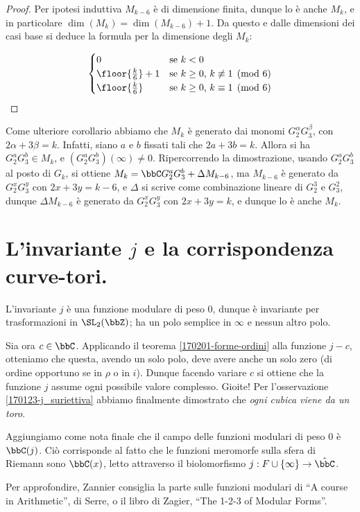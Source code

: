\begin{proof}
	Per ipotesi induttiva $M_{k-6}$ è di dimensione finita, dunque lo è anche $M_k$, e in particolare $\dim(M_k)=\dim(M_{k-6})+1$.
	Da questo e dalle dimensioni dei casi base si deduce la formula per la dimensione degli $M_k$:
	
	\begin{equation*}
		\begin{cases}
			0 						&	\text{se $k<0$}\\
			\floor{\frac{k}{6}} +1	&	\text{se $k\geq0$, $k\not\equiv1\pmod{6}$}\\
			\floor{\frac{k}{6}}		&	\text{se $k\geq0$, $k\equiv1\pmod{6}$}
		\end{cases}
	\end{equation*}

\end{proof}

Come ulteriore corollario abbiamo che $M_k$ è generato dai monomi $G_2^\alpha G_3^\beta$, con $2\alpha+3\beta=k$.
Infatti, siano $a$ e $b$ fissati tali che $2a+3b=k$.
Allora si ha $G_2^a G_3^b\in M_k$, e $(G_2^a G_3^b)(\infty)\neq0$.
Ripercorrendo la dimostrazione, usando $G_2^a G_3^b$ al posto di $G_k$, si ottiene $M_k=\bbC G_2^a G_3^b + \Delta M_{k-6}$, ma $M_{k-6}$ è generato da $G_2^x G_3^y$ con $2x+3y=k-6$, e $\Delta$ si scrive come combinazione lineare di $G_2^3$ e $G_3^2$, dunque $\Delta M_{k-6}$ è generato da $G_2^x G_3^y$ con $2x+3y=k$, e dunque lo è anche $M_k$.


\section{L'invariante $j$ e la corrispondenza curve-tori.}

L'invariante $j$ è una funzione modulare di peso $0$, dunque è invariante per trasformazioni in $\SL_2(\bbZ)$; ha un polo semplice in $\infty$ e nessun altro polo.

Sia ora $c \in \bbC$. Applicando il teorema \ref{170201-forme-ordini} alla funzione $j-c$, otteniamo che questa, avendo un solo polo, deve avere anche un solo zero (di ordine opportuno se in $\rho$ o in $i$). Dunque facendo variare $c$ si ottiene che la funzione $j$ assume ogni possibile valore complesso. Gioite! Per l'osservazione \ref{170123-j_suriettiva} abbiamo finalmente dimostrato che \emph{ogni cubica viene da un toro}.

Aggiungiamo come nota finale che il campo delle funzioni modulari di peso $0$ è $\bbC(j)$. Ciò corrisponde al fatto che le funzioni meromorfe sulla sfera di Riemann sono $\bbC(x)$, letto attraverso il biolomorfismo $j : F \cup \{ \infty \} \rightarrow \hat \bbC$.

Per approfondire, Zannier consiglia la parte sulle funzioni modulari di ``A course in Arithmetic'', di Serre, o il libro di Zagier, ``The 1-2-3 of Modular Forms''.

